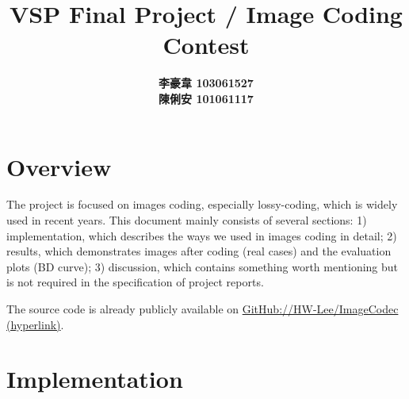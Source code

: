 \documentclass[12pt]{article}
\title{\textbf{VSP Final Project / Image Coding Contest}}
\author{\textbf{李豪韋 103061527} \\ \textbf{陳俐安 101061117}}
\date{}
\begin{document}
\vspace*{-60pt}
    {\let\newpage\relax\maketitle}

\vspace{-4em}
\section*{Overview}
\vspace{-20pt}
\noindent\makebox[\linewidth]{\rule{\textwidth}{0.4pt}}
\vspace{5pt}

The project is focused on images coding, especially lossy-coding, which is widely used in recent years. This document mainly consists of several sections: 1) implementation, which describes the ways we used in images coding in detail; 2) results, which demonstrates images after coding (real cases) and the evaluation plots (BD curve); 3) discussion, which contains something worth mentioning but is not required in the specification of project reports.

The source code is already publicly available on \href{https://github.com/HW-Lee/ImageCodec}{GitHub://HW-Lee/ImageCodec (hyperlink)}.

\section*{Implementation}
\vspace{-20pt}
\noindent\makebox[\linewidth]{\rule{\textwidth}{0.4pt}}
\end{document}
